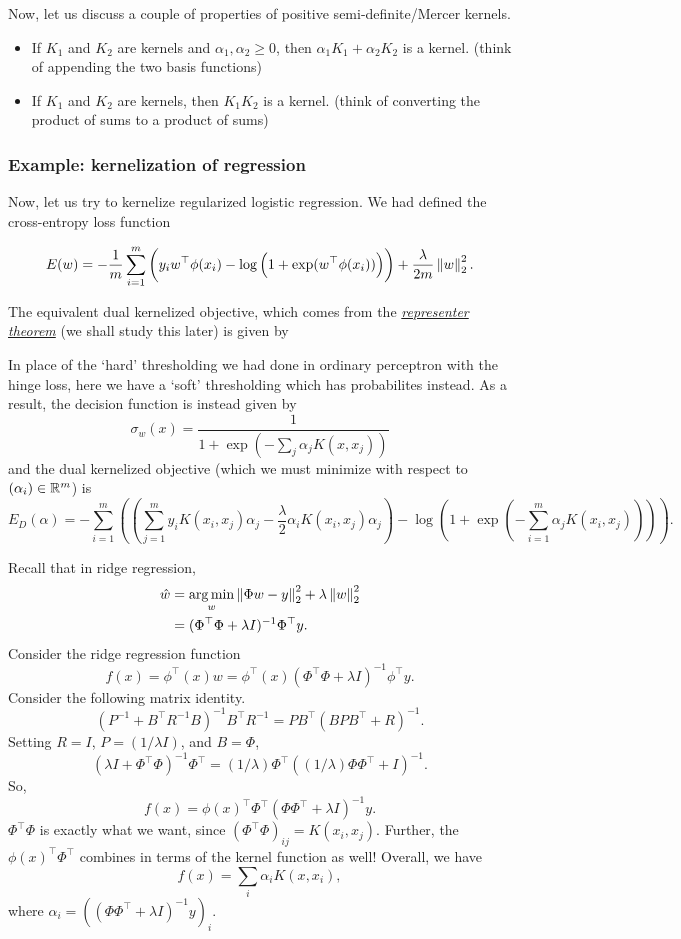\documentclass{article}
\begin{document}
			Now, let us discuss a couple of properties of positive semi-definite/Mercer kernels.

			\begin{itemize}
				\item If $K_1$ and $K_2$ are kernels and $\alpha_1,\alpha_2 \ge 0$, then $\alpha_1 K_1 + \alpha_2 K_2$ is a kernel. (think of appending the two basis functions)
				\item If $K_1$ and $K_2$ are kernels, then $K_1 K_2$ is a kernel. (think of converting the product of sums to a product of sums)
			\end{itemize}

		\subsubsection{Example: kernelization of regression}

			Now, let us try to kernelize regularized logistic regression. We had defined the cross-entropy loss function

			\[ E(w) = - \frac{1}{m} \sum_{i=1}^m \left( y_i w^\top \phi(x_i) - \log\left( 1 + \exp(w^\top\phi(x_i)) \right) \right) + \frac{\lambda}{2m} \left\lVert w\right\rVert_2^2. \]

			The equivalent dual kernelized objective, which comes from the \href{https://en.wikipedia.org/wiki/Representer_theorem}{\emph{representer theorem}} (we shall study this later) is given by

			In place of the `hard' thresholding we had done in ordinary perceptron with the hinge loss, here we have a `soft' thresholding which has probabilites instead. As a result, the decision function is instead given by
			\[ \sigma_w(x) = \frac{1}{1 + \exp(- \sum_j \alpha_j K(x,x_j))} \]
			and the dual kernelized objective (which we must minimize with respect to $(\alpha_i) \in \mathbb{R}^m$) is
			\[ E_D(\alpha) = - \sum_{i=1}^m \left(\left(\sum_{j=1}^m y_i K(x_i, x_j) \alpha_j - \frac{\lambda}{2} \alpha_i K(x_i,x_j) \alpha_j\right) - \log\left( 1 + \exp\left(-\sum_{i=1}^m \alpha_j K(x_i,x_j)\right) \right)\right). \]

			Recall that in ridge regression,
			\begin{align*}
				\hat{w} &= \operatorname*{arg\,min}_w \left\lVert\Phi w - y\right\rVert_2^2 + \lambda\left\lVert w\right\rVert_2^2 \\
					&= (\Phi^\top\Phi + \lambda I)^{-1} \Phi^\top y.	
			\end{align*}
			Consider the ridge regression function
			\[ f(x) = \phi^\top(x) w = \phi^\top(x) (\Phi^\top\Phi + \lambda I)^{-1}\phi^\top y. \]
			Consider the following matrix identity.
			\[ (P^{-1} + B^\top R^{-1} B)^{-1} B^\top R^{-1} = PB^\top (BPB^\top + R)^{-1}. \]
			Setting $R = I$, $P = (1/\lambda I)$, and $B = \Phi$,
			\[ (\lambda I + \Phi^\top\Phi)^{-1} \Phi^\top = (1/\lambda) \Phi^\top ( (1/\lambda) \Phi\Phi^\top + I )^{-1}. \]
			So,
			\[ f(x) = \phi(x)^\top \Phi^\top ( \Phi\Phi^\top + \lambda I )^{-1} y. \]
			$\Phi^\top\Phi$ is exactly what we want, since $(\Phi^\top\Phi)_{ij} = K(x_i,x_j)$. Further, the $\phi(x)^\top \Phi^\top$ combines in terms of the kernel function as well! Overall, we have
			\[ f(x) = \sum_i \alpha_i K(x,x_i), \]
			where $\alpha_i = ( (\Phi\Phi^\top + \lambda I)^{-1} y )_i$.
\end{document}

